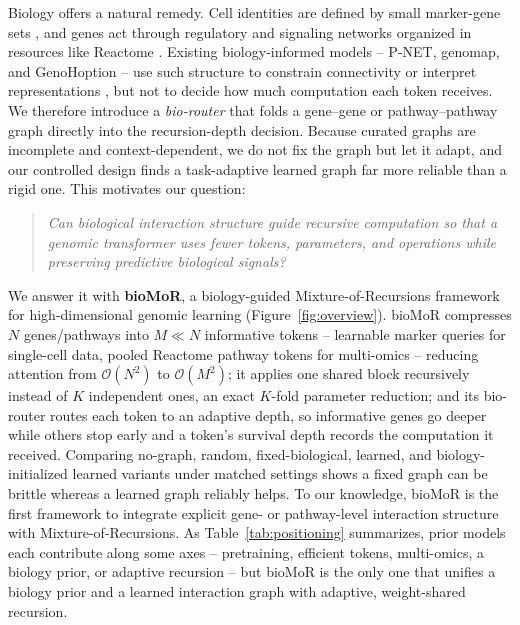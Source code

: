 \documentclass[letterpaper]{article}
\begin{document}
Biology offers a natural remedy. Cell identities are defined by small marker-gene
sets \cite{aran2019singler,cortal2021cellid,ianevski2022sctype,franzen2019panglaodb,hu2023cellmarker},
and genes act through regulatory and signaling networks organized in resources like
Reactome \cite{gillespie2022reactome}. Existing biology-informed models -- P-NET,
genomap, and GenoHoption -- use such structure to constrain connectivity or
interpret representations
\cite{elmarakeby2021biologically,islam2023cartography,cheng2024genohoption}, but
not to decide how much computation each token receives. We therefore introduce a
\emph{bio-router} that folds a gene--gene or pathway--pathway graph directly into
the recursion-depth decision. Because curated graphs are incomplete and
context-dependent, we do not fix the graph but let it adapt, and our controlled
design finds a task-adaptive learned graph far more reliable than a rigid one. This
motivates our question:

\begin{quote}
\emph{Can biological interaction structure guide recursive computation so that a
genomic transformer uses fewer tokens, parameters, and operations while preserving
predictive biological signals?}
\end{quote}

We answer it with \textbf{bioMoR}, a biology-guided Mixture-of-Recursions framework
for high-dimensional genomic learning (Figure~\ref{fig:overview}). bioMoR
compresses $N$ genes/pathways into $M \ll N$ informative tokens -- learnable marker
queries for single-cell data, pooled Reactome pathway tokens for multi-omics --
reducing attention from $\mathcal{O}(N^2)$ to $\mathcal{O}(M^2)$; it applies one
shared block recursively instead of $K$ independent ones, an exact $K$-fold
parameter reduction; and its bio-router routes each token to an adaptive depth, so
informative genes go deeper while others stop early and a token's survival depth
records the computation it received. Comparing no-graph, random, fixed-biological,
learned, and biology-initialized learned variants under matched settings shows a
fixed graph can be brittle whereas a learned graph reliably helps. To our knowledge,
bioMoR is the first framework to integrate explicit gene- or pathway-level
interaction structure with Mixture-of-Recursions. As Table~\ref{tab:positioning}
summarizes, prior models each contribute along some axes -- pretraining, efficient
tokens, multi-omics, a biology prior, or adaptive recursion -- but bioMoR is the only
one that unifies a biology prior and a learned interaction graph with adaptive,
weight-shared recursion.
\end{document}
